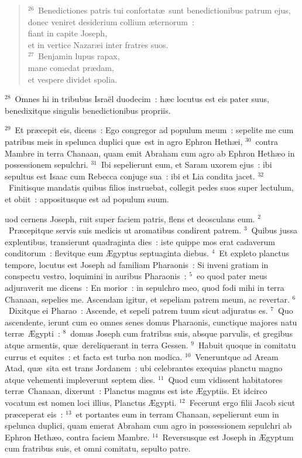 \begin{verse}
${}^{26}$~Benedictiones patris tui confortat\ae\ sunt benedictionibus patrum ejus,\\ donec veniret desiderium collium \ae ternorum~:\\ fiant in capite Joseph,\\ et in vertice Nazar\ae i inter fratres suos.\\
${}^{27}$~Benjamin lupus rapax,\\ mane comedat pr\ae dam,\\ et vespere dividet spolia.\end{verse}


${}^{28}$~Omnes hi in tribubus Isra\"el duodecim~: h\ae c locutus est eis pater suus, benedixitque singulis benedictionibus propriis.


${}^{29}$~Et pr\ae cepit eis, dicens~: Ego congregor ad populum meum~: sepelite me cum patribus meis in spelunca duplici qu\ae\ est in agro Ephron Heth\ae i,
${}^{30}$~contra Mambre in terra Chanaan, quam emit Abraham cum agro ab Ephron Heth\ae o in possessionem sepulchri.
${}^{31}$~Ibi sepelierunt eum, et Saram uxorem ejus~: ibi sepultus est Isaac cum Rebecca conjuge sua~: ibi et Lia condita jacet.
${}^{32}$~Finitisque mandatis quibus filios instruebat, collegit pedes suos super lectulum, et obiit~: appositusque est ad populum suum.

\bchapter
{}uod cernens Joseph, ruit super faciem patris, flens et deosculans eum.
${}^{2}$~Pr\ae cepitque servis suis medicis ut aromatibus condirent patrem.
${}^{3}$~Quibus jussa explentibus, transierunt quadraginta dies~: iste quippe mos erat cadaverum conditorum~: flevitque eum \AE gyptus septuaginta diebus.
${}^{4}$~Et expleto planctus tempore, locutus est Joseph ad familiam Pharaonis~: Si inveni gratiam in conspectu vestro, loquimini in auribus Pharaonis~:
${}^{5}$~eo quod pater meus adjuraverit me dicens~: En morior~: in sepulchro meo, quod fodi mihi in terra Chanaan, sepelies me. Ascendam igitur, et sepeliam patrem meum, ac revertar.
${}^{6}$~Dixitque ei Pharao~: Ascende, et sepeli patrem tuum sicut adjuratus es.
${}^{7}$~Quo ascendente, ierunt cum eo omnes senes domus Pharaonis, cunctique majores natu terr\ae\ \AE gypti~:
${}^{8}$~domus Joseph cum fratribus suis, absque parvulis, et gregibus atque armentis, qu\ae\ dereliquerant in terra Gessen.
${}^{9}$~Habuit quoque in comitatu currus et equites~: et facta est turba non modica.
${}^{10}$~Veneruntque ad Aream Atad, qu\ae\ sita est trans Jordanem~: ubi celebrantes exequias planctu magno atque vehementi impleverunt septem dies.
${}^{11}$~Quod cum vidissent habitatores terr\ae\ Chanaan, dixerunt~: Planctus magnus est iste \AE gyptiis. Et idcirco vocatum est nomen loci illius, Planctus \AE gypti.
${}^{12}$~Fecerunt ergo filii Jacob sicut pr\ae ceperat eis~:
${}^{13}$~et portantes eum in terram Chanaan, sepelierunt eum in spelunca duplici, quam emerat Abraham cum agro in possessionem sepulchri ab Ephron Heth\ae o, contra faciem Mambre.
${}^{14}$~Reversusque est Joseph in \AE gyptum cum fratribus suis, et omni comitatu, sepulto patre.


